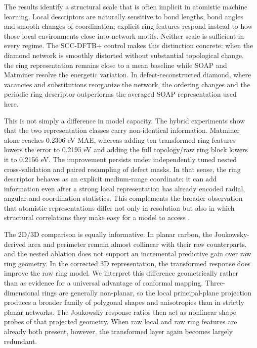 \documentclass[twoside,twocolumn,9pt]{article}
\begin{document}
The results identify a structural scale that is often implicit in atomistic machine learning. Local descriptors are naturally sensitive to bond lengths, bond angles and smooth changes of coordination; explicit ring features respond instead to how those local environments close into network motifs. Neither scale is sufficient in every regime. The SCC-DFTB+ control makes this distinction concrete: when the diamond network is smoothly distorted without substantial topological change, the ring representation remains close to a mean baseline while SOAP and Matminer resolve the energetic variation. In defect-reconstructed diamond, where vacancies and substitutions reorganize the network, the ordering changes and the periodic ring descriptor outperforms the averaged SOAP representation used here.

This is not simply a difference in model capacity. The hybrid experiments show that the two representation classes carry non-identical information. Matminer alone reaches 0.2306 eV MAE, whereas adding ten transformed ring features lowers the error to 0.2195 eV and adding the full topology/raw ring block lowers it to 0.2156 eV. The improvement persists under independently tuned nested cross-validation and paired resampling of defect masks. In that sense, the ring descriptor behaves as an explicit medium-range coordinate: it can add information even after a strong local representation has already encoded radial, angular and coordination statistics. This complements the broader observation that atomistic representations differ not only in resolution but also in which structural correlations they make easy for a model to access \cite{Musil2021,Pozdnyakov2020}.

The 2D/3D comparison is equally informative. In planar carbon, the Joukowsky-derived area and perimeter remain almost collinear with their raw counterparts, and the nested ablation does not support an incremental predictive gain over raw ring geometry. In the corrected 3D representation, the transformed response does improve the raw ring model. We interpret this difference geometrically rather than as evidence for a universal advantage of conformal mapping. Three-dimensional rings are generally non-planar, so the local principal-plane projection produces a broader family of polygonal shapes and anisotropies than in strictly planar networks. The Joukowsky response ratios then act as nonlinear shape probes of that projected geometry. When raw local and raw ring features are already both present, however, the transformed layer again becomes largely redundant.
\end{document}
